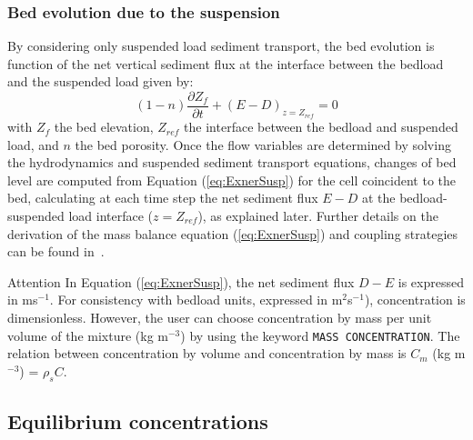 \subsubsection{Bed evolution due to the suspension}
By considering only suspended load sediment transport, the bed evolution is function of the net vertical sediment flux at the interface between the bedload and the suspended
load given by: 
\begin{equation}\label{eq:ExnerSusp}
(1-n)\frac{\partial Z_f}{\partial t} + (E-D)_{z=Z_{ref}} = 0  
\end{equation}
with $Z_f$ the bed elevation, $Z_{ref}$ the interface between the
bedload and suspended load, and $n$ the bed porosity. Once the flow variables are determined by solving the hydrodynamics and suspended sediment transport equations, changes of bed level are computed from Equation (\ref{eq:ExnerSusp}) for the cell coincident to the bed, calculating at each time step the net sediment flux $E-D$ at the bedload-suspended load
interface ($z = Z_{ref}$), as explained later. Further details on the derivation of the mass balance equation (\ref{eq:ExnerSusp}) and coupling strategies can be found in~\cite{Wu}.

\begin{bclogo}[couleur = blue!10, arrondi = 0.10, logo = \bcattention]{\textsf{Attention}}
In Equation (\ref{eq:ExnerSusp}), the net sediment flux $D-E$ is expressed in ms$^{-1}$. 
For consistency with bedload units, expressed in m$^{2}$s$^{-1}$), concentration is dimensionless. 
However, the user can choose concentration by mass per unit volume of the mixture (kg m$^{-3}$) by using the keyword \texttt{MASS CONCENTRATION}. The relation between concentration by volume and concentration by mass is $C_m$ (kg m$^{-3}$) = $\rho_s C$.
\end{bclogo}

\subsection{Equilibrium concentrations}

